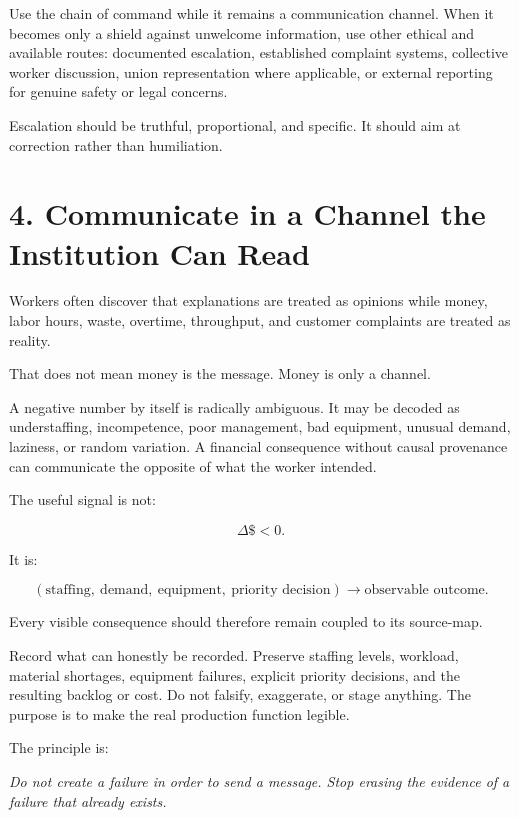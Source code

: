 \documentclass[11pt,oneside]{article}
\renewenvironment{quote}
  {\begin{tcolorbox}[
      enhanced,
      breakable,
      colback=ManifestLight,
      colframe=ManifestRule,
      boxrule=0pt,
      leftrule=3pt,
      arc=0pt,
      outer arc=0pt,
      left=10pt,right=10pt,top=8pt,bottom=8pt,
      before skip=0.8em,after skip=0.8em
    ]\itshape}
  {\end{tcolorbox}}
\begin{document}
Use the chain of command while it remains a communication channel. When it becomes only a shield against unwelcome information, use other ethical and available routes: documented escalation, established complaint systems, collective worker discussion, union representation where applicable, or external reporting for genuine safety or legal concerns.

Escalation should be truthful, proportional, and specific. It should aim at correction rather than humiliation.

\section{4. Communicate in a Channel the Institution Can Read}\label{communicate-in-a-channel-the-institution-can-read}

Workers often discover that explanations are treated as opinions while money, labor hours, waste, overtime, throughput, and customer complaints are treated as reality.

That does not mean money is the message. Money is only a channel.

A negative number by itself is radically ambiguous. It may be decoded as understaffing, incompetence, poor management, bad equipment, unusual demand, laziness, or random variation. A financial consequence without causal provenance can communicate the opposite of what the worker intended.

The useful signal is not:

\[
\Delta \$ < 0.
\]

It is:

\[
(\text{staffing},\ \text{demand},\ \text{equipment},\ \text{priority decision})
\longrightarrow
\text{observable outcome}.
\]

Every visible consequence should therefore remain coupled to its source-map.

Record what can honestly be recorded. Preserve staffing levels, workload, material shortages, equipment failures, explicit priority decisions, and the resulting backlog or cost. Do not falsify, exaggerate, or stage anything. The purpose is to make the real production function legible.

The principle is:

\begin{quote}
Do not create a failure in order to send a message. Stop erasing the evidence of a failure that already exists.
\end{quote}
\end{document}
